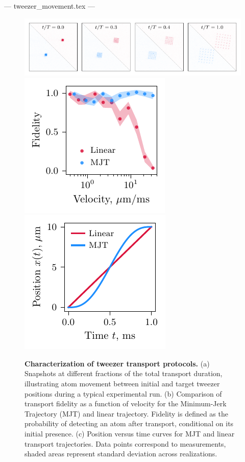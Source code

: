 --- tweezer_movement.tex ---



\begin{figure}[h]
\centering
{}
\includegraphics{fig-py/movement-inset.pdf} \\
\includegraphics{fig-py/movement-1.pdf}
\hspace{1cm}
\includegraphics{fig-py/movement-2.pdf}
\caption{
\textbf{Characterization of tweezer transport protocols.}
(a) Snapshots at different fractions of the total transport duration, illustrating atom movement between initial and target tweezer positions during a typical experimental run.
(b) Comparison of transport fidelity as a function of velocity for the Minimum-Jerk Trajectory (MJT) and linear trajectory. Fidelity is defined as the probability of detecting an atom after transport, conditional on its initial presence.
(c) Position versus time curves for MJT and linear transport trajectories.
Data points correspond to measurements, shaded areas represent standard deviation across realizations.
}
\label{fig:movement}
\end{figure}



